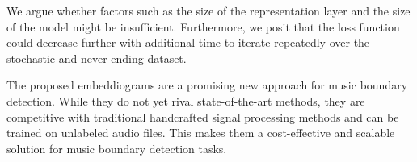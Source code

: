 We argue whether factors such as the size of the representation layer and the size of the model \cite{verydeep} might be insufficient. Furthermore, we posit that the loss function could decrease further with additional time to iterate repeatedly over the stochastic and never-ending dataset.

The proposed embeddiograms are a promising new approach for music boundary detection. While they do not yet rival state-of-the-art methods, they are competitive with traditional handcrafted signal processing methods and can be trained on unlabeled audio files. This makes them a cost-effective and scalable solution for music boundary detection tasks.

\newpage



